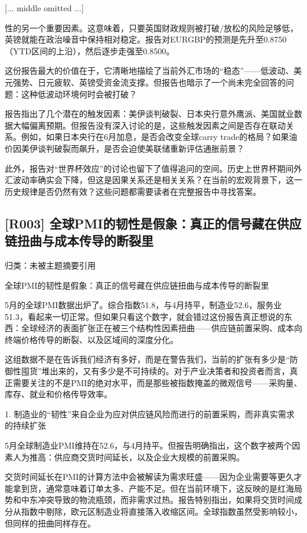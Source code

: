 \documentclass[11pt]{ctexart}
\begin{document}
[... middle omitted ...]

性的另一个重要因素。这意味着，只要英国财政规则被打破/放松的风险足够低，英镑就能在政治噪音中保持相对稳定。报告对EURGBP的预测是先升至0.8750（YTD区间的上沿），然后逐步走强至0.8500。

这份报告最大的价值在于，它清晰地描绘了当前外汇市场的“稳态”——低波动、美元强势、日元疲软、英镑受资金流支撑。但报告也暗示了一个尚未完全回答的问题：这种低波动环境何时会被打破？

报告指出了几个潜在的触发因素：美伊谈判破裂、日本央行意外鹰派、美国就业数据大幅偏离预期。但报告没有深入讨论的是，这些触发因素之间是否存在联动关系。例如，如果日本央行在6月加息，是否会改变全球carry trade的格局？如果油价因美伊谈判破裂而飙升，是否会迫使美联储重新评估通胀前景？

此外，报告对“世界杯效应”的讨论也留下了值得追问的空间。历史上世界杯期间外汇波动率确实会下降，但这是因果关系还是相关关系？在当前的宏观背景下，这一历史规律是否仍然有效？这些问题都需要读者在完整报告中寻找答案。

\subsection{[R003] 全球PMI的韧性是假象：真正的信号藏在供应链扭曲与成本传导的断裂里}
{\small\color{refgray}归类：未被主题摘要引用}

全球PMI的韧性是假象：真正的信号藏在供应链扭曲与成本传导的断裂里

5月的全球PMI数据出炉了。综合指数51.8，与4月持平，制造业52.6，服务业51.3，看起来一切正常。但如果只看这个数字，就会错过这份报告真正想说的东西：全球经济的表面扩张正在被三个结构性因素扭曲——供应链前置采购、成本向终端价格传导的断裂、以及区域间的深度分化。

这组数据不是在告诉我们经济有多好，而是在警告我们，当前的扩张有多少是“防御性囤货”堆出来的，又有多少是不可持续的。对于产业决策者和投资者而言，真正需要关注的不是PMI的绝对水平，而是那些被指数掩盖的微观信号——采购量、库存、就业和价格传导效率。

1. 制造业的“韧性”来自企业为应对供应链风险而进行的前置采购，而非真实需求的持续扩张

5月全球制造业PMI维持在52.6，与4月持平。但报告明确指出，这个数字被两个因素人为推高：供应商交货时间延长，以及企业大规模的前置采购。

交货时间延长在PMI的计算方法中会被解读为需求旺盛——因为企业需要等更久才能拿到货，通常意味着订单太多、产能不足。但在当前环境下，这反映的是红海局势和中东冲突导致的物流瓶颈，而非需求过热。报告特别指出，如果将交货时间成分从指数中剔除，欧元区制造业将直接落入收缩区间。全球指数虽然受影响较小，但同样的扭曲同样存在。
\end{document}
